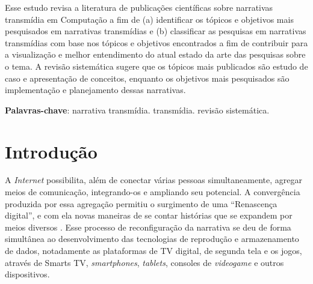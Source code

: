 \documentclass[
article,			%
11pt,				%
oneside,			%
a4paper,			%
english,			%
brazil,				%
sumario=tradicional
]{abntex2}
\begin{document}

  \frenchspacing


  \maketitle

  \begin{resumoumacoluna}
    Esse estudo revisa a literatura de publicações científicas sobre narrativas transmídia em Computação a fim de (a) identificar os tópicos e objetivos mais pesquisados em narrativas transmídias e (b) classificar as pesquisas em narrativas transmídias com base nos tópicos e objetivos encontrados a fim de contribuir para a visualização e melhor entendimento do atual estado da arte das pesquisas sobre o tema. A revisão sistemática sugere que os tópicos mais publicados são estudo de caso e apresentação de conceitos, enquanto os objetivos mais pesquisados são implementação e planejamento dessas narrativas.

    \vspace{\onelineskip}

    \noindent
    \textbf{Palavras-chave}: narrativa transmídia. transmídia. revisão sistemática.
  \end{resumoumacoluna}

  \textual

  \section{Introdução}

  A \textit{Internet} possibilita, além de conectar várias pessoas simultaneamente, agregar meios de comunicação, integrando-os e ampliando seu potencial. A convergência produzida por essa agregação permitiu o surgimento de uma ``Renascença digital'', e com ela novas maneiras de se contar histórias que se expandem por meios diversos \cite{jenkins_2001}. Esse processo de reconfiguração da narrativa se deu de forma simultânea ao desenvolvimento das tecnologias de reprodução e armazenamento de dados, notadamente as plataformas de TV digital, de segunda tela e os jogos, através de Smarts TV, \textit{smartphones}, \textit{tablets}, consoles de \textit{videogame} e outros dispositivos.
\end{document}
